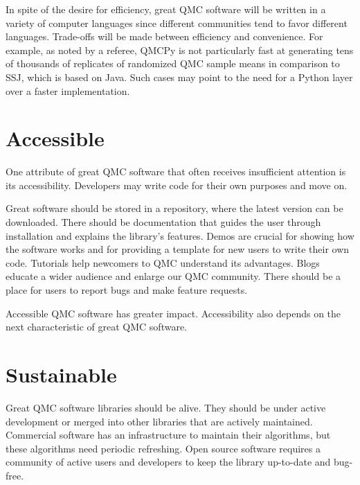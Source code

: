 \documentclass[graybox]{svmult}
\begin{document}
In spite of the desire for efficiency, great QMC software will be written in a variety of computer languages since different communities tend to favor different languages. Trade-offs will be made between efficiency and convenience.
For example, as noted by a referee, QMCPy is not particularly fast at generating tens of thousands of replicates of randomized QMC sample means in comparison to SSJ, which is based on Java. Such cases may point to the need for a Python layer over a faster implementation.

\section{Accessible} \label{CDHJS_sec:accessible}
One attribute of great QMC software that often receives insufficient attention is its accessibility.  Developers may write code for their own purposes and move on.

Great software should be stored in a repository, where the latest version can be downloaded.  There should be documentation that guides the user through installation and explains the library's features.  Demos are crucial for showing how the software works and for providing a template for new users to write their own code.  Tutorials help newcomers to QMC understand its advantages. Blogs educate a wider audience and enlarge our QMC community.  There should be a place for users to report bugs and make feature requests.

Accessible QMC software has greater impact.  Accessibility also depends on the next characteristic of great QMC software.


\section{Sustainable} \label{CDHJS_sec:sustainable}
Great QMC software libraries should be alive.  They should be under active development or merged into other libraries that are actively maintained.  Commercial software has an infrastructure to maintain their algorithms, but these algorithms need periodic refreshing. Open source software requires a community of active users and developers to keep the library up-to-date and bug-free.
\end{document}
